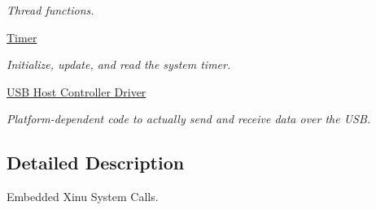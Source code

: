 \begin{DoxyCompactItemize}
\begin{DoxyCompactList}\small\item\em Thread functions. \end{DoxyCompactList}\item 
\hyperlink{group__timer}{Timer}
\begin{DoxyCompactList}\small\item\em Initialize, update, and read the system timer. \end{DoxyCompactList}\item 
\hyperlink{group__usbhcd}{U\-S\-B Host Controller Driver}
\begin{DoxyCompactList}\small\item\em Platform-\/dependent code to actually send and receive data over the U\-S\-B. \end{DoxyCompactList}\end{DoxyCompactItemize}


\subsection{Detailed Description}
Embedded Xinu System Calls. 